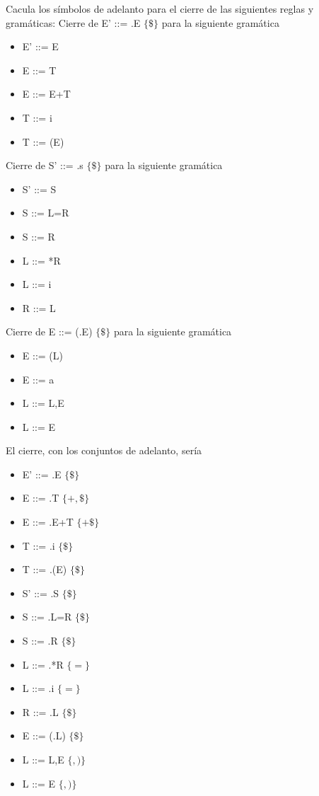 \documentclass[nochap]{apuntes}
\begin{document}
\begin{problem}
Cacula los símbolos de adelanto para el cierre de las siguientes reglas y gramáticas:
\ppart Cierre de E' ::= .E $\{ \$ \}$ para la siguiente gramática
\begin{itemize}
\item E' ::= E
\item E ::= T
\item E ::= E+T
\item T ::= i
\item T ::= (E)
\end{itemize}

\ppart Cierre de S' ::= .s $\{ \$ \}$ para la siguiente gramática
\begin{itemize}
\item S' ::= S
\item S ::= L=R
\item S ::= R
\item L ::= *R
\item L ::= i
\item R ::= L
\end{itemize}

\ppart Cierre de E ::= (.E) $\{ \$ \}$ para la siguiente gramática
\begin{itemize}
\item E ::= (L)
\item E ::= a
\item L ::= L,E
\item L ::= E
\end{itemize}
\solution
\ppart
El cierre, con los conjuntos de adelanto, sería
\begin{itemize}
\item E' ::= .E $\{\$\}$
\item E ::= .T $\{+,\$\}$
\item E ::= .E+T $\{+ \$\}$
\item T ::= .i $\{\$\}$
\item T ::= .(E) $\{\$\}$
\end{itemize}

\ppart
\begin{itemize}
\item S' ::= .S $\{\$\}$
\item S ::= .L=R $\{\$\}$
\item S ::= .R $\{\$\}$
\item L ::= .*R $\{=\}$
\item L ::= .i $\{=\}$
\item R ::= .L $\{\$\}$
\end{itemize}

\ppart
\begin{itemize}
\item E ::= (.L) $\{\$\}$
\item L ::= L,E $\{, )\}$
\item L ::= E $\{, )\}$
\end{itemize}
\end{problem}
\end{document}
